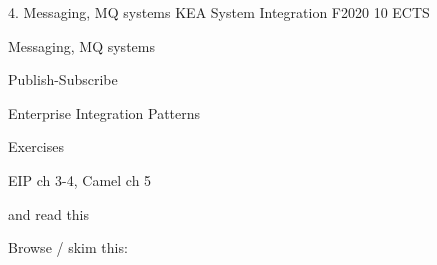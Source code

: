 \documentclass[Screen16to9,17pt]{foils}
\begin{document}
\mytitlepage
{4. Messaging, MQ systems}
{KEA System Integration F2020 10 ECTS}


\begin{list2}
\item Messaging, MQ systems
\item  Publish-Subscribe
\item Enterprise Integration Patterns
\end{list2}

Exercises
\begin{list2}
\item
\item
\end{list2}




\begin{list1}
\item EIP ch 3-4, Camel ch 5

and read this\\

\item Browse / skim this:\\

\end{list1}




\slidenext
\end{document}
